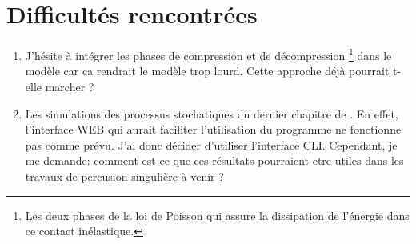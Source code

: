 \documentclass[
  french,
	11pt, %
]{fphw}
\begin{document}
\section*{Difficultés rencontrées}


\begin{enumerate}
  \item J'hésite à intégrer les phases de compression et de décompression \footnote{Les deux phases de la loi de Poisson qui assure la dissipation de l'énergie dans ce contact inélastique.} dans le modèle car ca rendrait le modèle trop lourd. Cette approche déjà pourrait t-elle marcher ?
  \item Les simulations des processus stochatiques du dernier chapitre de \parencite{balasoiu2020halthesis}. En effet, l'interface WEB qui aurait faciliter l'utilisation du programme ne fonctionne pas comme prévu. J'ai donc décider d'utiliser l'interface CLI. Cependant, je me demande: comment est-ce que ces résultats pourraient etre utiles dans les travaux de percusion singulière à venir ?
\end{enumerate}





\clearpage   %
\printbibliography
\end{document}

